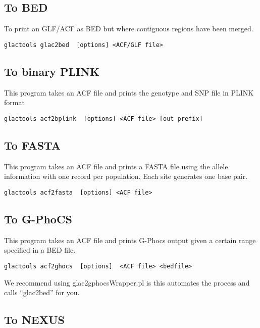 \documentclass[a4paper]{article}
\begin{document}
\subsection{To BED}

To print an GLF/ACF as BED but where contiguous regions have been merged.
\begin{lstlisting}
glactools glac2bed  [options] <ACF/GLF file>
\end{lstlisting}


\subsection{To binary PLINK}

\noindent This program takes an ACF file and prints the genotype and SNP file in PLINK format

\tiny
\begin{lstlisting}
glactools acf2bplink  [options] <ACF file> [out prefix]
\end{lstlisting}
\normalsize

\subsection{To FASTA}

\noindent This program takes an ACF file and prints a FASTA file using the allele information with one record per population. Each site generates one base pair.

\begin{lstlisting}
glactools acf2fasta  [options] <ACF file>
\end{lstlisting}


\subsection{To G-PhoCS}

\noindent This program takes an ACF file and prints G-Phocs output given a certain range specified in a BED file.

\begin{lstlisting}
glactools acf2ghocs  [options]  <ACF file> <bedfile>
\end{lstlisting}

We recommend using glac2gphocsWrapper.pl is this automates the process and calls ``glac2bed'' for you.

\subsection{To NEXUS}
\end{document}
